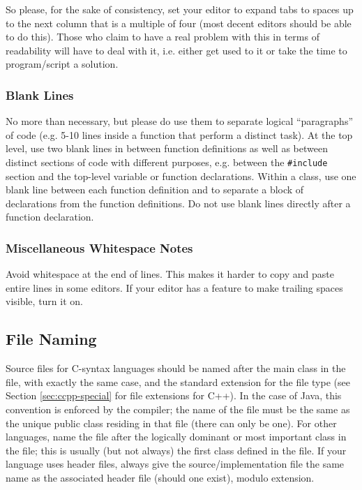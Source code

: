 \documentclass[12pt]{article}
\newcommand{\code}[1]{\texttt{#1}}
\begin{document}
So please, for the sake of consistency, set your editor to expand tabs to spaces up to the next column that is a multiple of four (most decent editors should be able to do this). Those who claim to have a real problem with this in terms of readability will have to deal with it, i.e. either get used to it or take the time to program/script a solution.

\subsubsection{Blank Lines}
No more than necessary, but please do use them to separate logical ``paragraphs'' of code (e.g. 5-10 lines inside a function that perform a distinct task). At the top level, use two blank lines in between function definitions as well as between distinct sections of code with different purposes, e.g. between the \code{\#include} section and the top-level variable or function declarations. Within a class, use one blank line between each function definition and to separate a block of declarations from the function definitions. Do not use blank lines directly after a function declaration.

\subsubsection{Miscellaneous Whitespace Notes}
Avoid whitespace at the end of lines. This makes it harder to copy and paste entire lines in some editors. If your editor has a feature to make trailing spaces visible, turn it on.

\subsection{File Naming}
Source files for C-syntax languages should be named after the main class in the file, with exactly the same case, and the standard extension for the file type (see Section \ref{sec:ccpp-special} for file extensions for C++). In the case of Java, this convention is enforced by the compiler; the name of the file must be the same as the unique public class residing in that file (there can only be one). For other languages, name the file after the logically dominant or most important class in the file; this is usually (but not always) the first class defined in the file. If your language uses header files, always give the source/implementation file the same name as the associated header file (should one exist), modulo extension.
\end{document}
